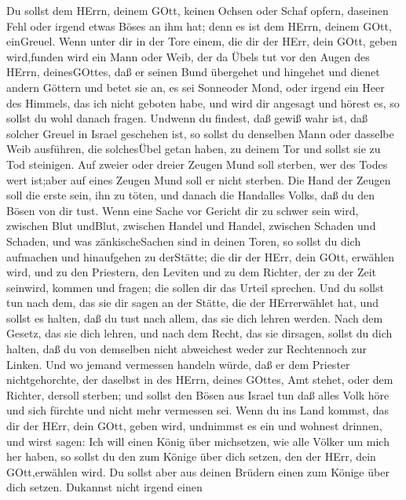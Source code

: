 Du sollst dem HErrn, deinem GOtt, keinen Ochsen oder Schaf
opfern, daseinen Fehl oder irgend etwas Böses an ihm hat; denn es ist
dem HErrn, deinem GOtt, einGreuel.  Wenn unter dir in der
Tore einem, die dir der HErr, dein GOtt, geben wird,funden wird ein Mann
oder Weib, der da Übels tut vor den Augen des HErrn, deinesGOttes, daß
er seinen Bund übergehet  und hingehet und dienet andern
Göttern und betet sie an, es sei Sonneoder Mond, oder irgend ein Heer
des Himmels, das ich nicht geboten habe,  und wird dir
angesagt und hörest es, so sollst du wohl danach fragen. Undwenn du
findest, daß gewiß wahr ist, daß solcher Greuel in Israel geschehen ist,
 so sollst du denselben Mann oder dasselbe Weib ausführen,
die solchesÜbel getan haben, zu deinem Tor und sollst sie zu Tod
steinigen.  Auf zweier oder dreier Zeugen Mund soll sterben,
wer des Todes wert ist;aber auf eines Zeugen Mund soll er nicht sterben.
 Die Hand der Zeugen soll die erste sein, ihn zu töten, und
danach die Handalles Volks, daß du den Bösen von dir tust. 
Wenn eine Sache vor Gericht dir zu schwer sein wird, zwischen Blut
undBlut, zwischen Handel und Handel, zwischen Schaden und Schaden, und
was zänkischeSachen sind in deinen Toren, so sollst du dich aufmachen
und hinaufgehen zu derStätte; die dir der HErr, dein GOtt, erwählen
wird,  und zu den Priestern, den Leviten und zu dem Richter,
der zu der Zeit seinwird, kommen und fragen; die sollen dir das Urteil
sprechen.  Und du sollst tun nach dem, das sie dir sagen an
der Stätte, die der HErrerwählet hat, und sollst es halten, daß du tust
nach allem, das sie dich lehren werden.  Nach dem Gesetz,
das sie dich lehren, und nach dem Recht, das sie dirsagen, sollst du
dich halten, daß du von demselben nicht abweichest weder zur Rechtennoch
zur Linken.  Und wo jemand vermessen handeln würde, daß er
dem Priester nichtgehorchte, der daselbst in des HErrn, deines GOttes,
Amt stehet, oder dem Richter, dersoll sterben; und sollst den Bösen aus
Israel tun  daß alles Volk höre und sich fürchte und nicht
mehr vermessen sei.  Wenn du ins Land kommst, das dir der
HErr, dein GOtt, geben wird, undnimmst es ein und wohnest drinnen, und
wirst sagen: Ich will einen König über michsetzen, wie alle Völker um
mich her haben,  so sollst du den zum Könige über dich
setzen, den der HErr, dein GOtt,erwählen wird. Du sollst aber aus deinen
Brüdern einen zum Könige über dich setzen. Dukannst nicht irgend einen
